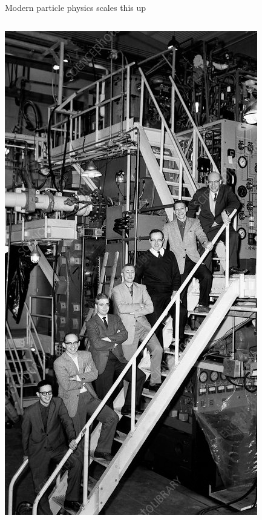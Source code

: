 \documentclass[aspectratio=169]{beamer}
\begin{document}
\begin{frame}{Modern particle physics scales this up}
\vspace{0.15 cm}
\begin{columns}
\includegraphics[width=\linewidth]{H4000010-Team_that_discovered_Omega_minus_particle.jpg}


\end{columns}
\end{frame}
\end{document}
